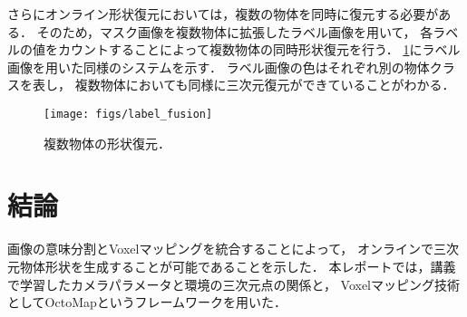 \documentclass{jarticle}
\begin{document}
さらにオンライン形状復元においては，複数の物体を同時に復元する必要がある．
そのため，マスク画像を複数物体に拡張したラベル画像を用いて，
各ラベルの値をカウントすることによって複数物体の同時形状復元を行う．
\ref{fig:label}にラベル画像を用いた同様のシステムを示す．
ラベル画像の色はそれぞれ別の物体クラスを表し，
複数物体においても同様に三次元復元ができていることがわかる．

\begin{figure}[htbp]
  \centering
  \texttt{[image: figs/label\_fusion]}
  \caption{複数物体の形状復元．}
  \label{fig:label}
\end{figure}


\section{結論}

画像の意味分割とVoxelマッピングを統合することによって，
オンラインで三次元物体形状を生成することが可能であることを示した．
本レポートでは，講義で学習したカメラパラメータと環境の三次元点の関係と，
Voxelマッピング技術としてOctoMapというフレームワークを用いた．


{\footnotesize


}
\end{document}
